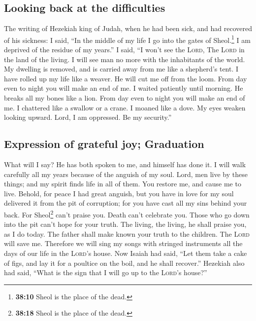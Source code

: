 \hypertarget{looking-back-at-the-difficulties}{%
\subsection{Looking back at the
difficulties}\label{looking-back-at-the-difficulties}}

 The writing of Hezekiah king of Judah, when he had been
sick, and had recovered of his sickness:  I said, ``In
the middle of my life I go into the gates of Sheol.\footnote{\textbf{38:10}
  Sheol is the place of the dead.} I am deprived of the residue of my
years.''  I said, ``I won't see the \textsc{Lord}, The
\textsc{Lord} in the land of the living. I will see man no more with the
inhabitants of the world.  My dwelling is removed, and is
carried away from me like a shepherd's tent. I have rolled up my life
like a weaver. He will cut me off from the loom. From day even to night
you will make an end of me.  I waited patiently until
morning. He breaks all my bones like a lion. From day even to night you
will make an end of me.  I chattered like a swallow or a
crane. I moaned like a dove. My eyes weaken looking upward. Lord, I am
oppressed. Be my security.''

\hypertarget{expression-of-grateful-joy-graduation}{%
\subsection{Expression of grateful joy;
Graduation}\label{expression-of-grateful-joy-graduation}}

 What will I say? He has both spoken to me, and himself
has done it. I will walk carefully all my years because of the anguish
of my soul.  Lord, men live by these things; and my
spirit finds life in all of them. You restore me, and cause me to live.
 Behold, for peace I had great anguish, but you have in
love for my soul delivered it from the pit of corruption; for you have
cast all my sins behind your back.  For Sheol\footnote{\textbf{38:18}
  Sheol is the place of the dead.} can't praise you. Death can't
celebrate you. Those who go down into the pit can't hope for your truth.
 The living, the living, he shall praise you, as I do
today. The father shall make known your truth to the children.
 The \textsc{Lord} will save me. Therefore we will sing
my songs with stringed instruments all the days of our life in the
\textsc{Lord}'s house.  Now Isaiah had said, ``Let them
take a cake of figs, and lay it for a poultice on the boil, and he shall
recover.''  Hezekiah also had said, ``What is the sign
that I will go up to the \textsc{Lord}'s house?''

